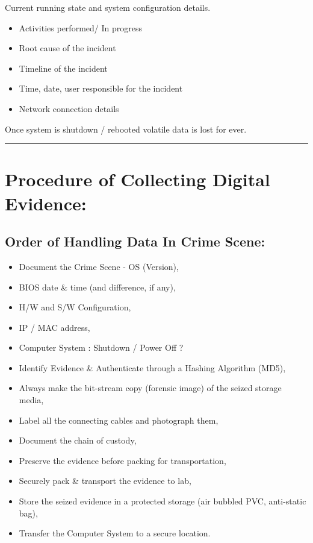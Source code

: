 \documentclass[british]{article}
\begin{document}
Current running state and system configuration details.
\begin{itemize}
	\item Activities performed/ In progress
	\item Root cause of the incident
	\item Timeline of the incident
	\item Time, date, user responsible for the incident
	\item Network connection details
\end{itemize}
Once system is shutdown / rebooted volatile data is lost for ever.

\rule[0.5ex]{0.75\columnwidth}{1pt}

\section{Procedure of Collecting Digital Evidence:}

\subsection{Order of Handling Data In Crime Scene:}
\begin{itemize}
	\item Document the Crime Scene - OS (Version),
	\item BIOS date \& time (and difference, if any),
	\item H/W and S/W Configuration,
	\item IP / MAC address,
	\item Computer System : Shutdown / Power Off ?
	\item Identify Evidence \& Authenticate through a Hashing Algorithm (MD5),
	\item Always make the bit-stream copy (forensic image) of the seized storage
	      media,
	\item Label all the connecting cables and photograph them,
	\item Document the chain of custody,
	\item Preserve the evidence before packing for transportation,
	\item Securely pack \& transport the evidence to lab,
	\item Store the seized evidence in a protected storage (air bubbled PVC,
	      anti-static bag),
	\item Transfer the Computer System to a secure location.
\end{itemize}
\end{document}

